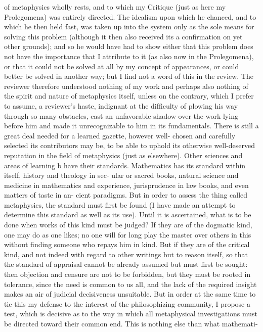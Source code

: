 of metaphysics wholly rests, and to which my Critique (just as here my
Prolegomena) was entirely directed. The idealism upon which he chanced,
and to which he then held fast, was taken up into the system only as the
sole means for solving this problem (although it then also received its a
conﬁrmation on yet other grounds); and so he would have had to show
either that this problem does not have the importance that I attribute
to it (as also now in the Prolegomena), or that it could not be solved at
all by my concept of appearances, or could better be solved in another
way; but I ﬁnd not a word of this in the review. The reviewer therefore
understood nothing of my work and perhaps also nothing of the spirit
and nature of metaphysics itself, unless on the contrary, which I prefer to
assume, a reviewer’s haste, indignant at the difﬁculty of plowing his way
through so many obstacles, cast an unfavorable shadow over the work
lying before him and made it unrecognizable to him in its fundamentals.
There is still a great deal needed for a learned gazette, however well-
chosen and carefully selected its contributors may be, to be able to uphold
its otherwise well-deserved reputation in the ﬁeld of metaphysics (just as
elsewhere). Other sciences and areas of learning b have their standards.
Mathematics has its standard within itself, history and theology in sec-
ular or sacred books, natural science and medicine in mathematics and
experience, jurisprudence in law books, and even matters of taste in an-
cient paradigms. But in order to assess the thing called metaphysics, the
standard must ﬁrst be found (I have made an attempt to determine this
standard as well as its use). Until it is ascertained, what is to be done
when works of this kind must be judged? If they are of the dogmatic
kind, one may do as one likes; no one will for long play the master over
others in this without ﬁnding someone who repays him in kind. But if
they are of the critical kind, and not indeed with regard to other writings
but to reason itself, so that the standard of appraisal cannot be already
assumed but must ﬁrst be sought: then objection and censure are not
to be forbidden, but they must be rooted in tolerance, since the need is
common to us all, and the lack of the required insight makes an air of
judicial decisiveness unsuitable.
But in order at the same time to tie this my defense to the interest
of the philosophizing community, I propose a test, which is decisive as
to the way in which all metaphysical investigations must be directed
toward their common end. This is nothing else than what mathemati-
